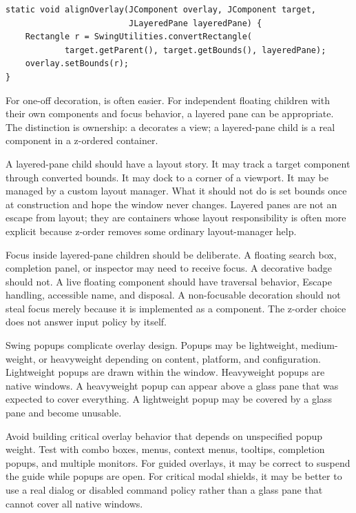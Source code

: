 \begin{lstlisting}[caption={Keeping an overlay component aligned with a target.}]
static void alignOverlay(JComponent overlay, JComponent target,
                         JLayeredPane layeredPane) {
    Rectangle r = SwingUtilities.convertRectangle(
            target.getParent(), target.getBounds(), layeredPane);
    overlay.setBounds(r);
}
\end{lstlisting}

For one-off decoration,  is often easier. For independent floating children with their own components and focus behavior, a layered pane can be appropriate. The distinction is ownership: a  decorates a view; a layered-pane child is a real component in a z-ordered container.

A layered-pane child should have a layout story. It may track a target component
through converted bounds. It may dock to a corner of a viewport. It may be
managed by a custom layout manager. What it should not do is set bounds once at
construction and hope the window never changes. Layered panes are not an escape
from layout; they are containers whose layout responsibility is often more
explicit because z-order removes some ordinary layout-manager help.

Focus inside layered-pane children should be deliberate. A floating search box,
completion panel, or inspector may need to receive focus. A decorative badge
should not. A live floating component should have traversal behavior, Escape
handling, accessible name, and disposal. A non-focusable decoration should not
steal focus merely because it is implemented as a component. The z-order choice
does not answer input policy by itself.

Swing popups complicate overlay design. Popups may be lightweight, medium-weight, or heavyweight depending on content, platform, and configuration. Lightweight popups are drawn within the window. Heavyweight popups are native windows. A heavyweight popup can appear above a glass pane that was expected to cover everything. A lightweight popup may be covered by a glass pane and become unusable.

Avoid building critical overlay behavior that depends on unspecified popup weight. Test with combo boxes, menus, context menus, tooltips, completion popups, and multiple monitors. For guided overlays, it may be correct to suspend the guide while popups are open. For critical modal shields, it may be better to use a real dialog or disabled command policy rather than a glass pane that cannot cover all native windows.

